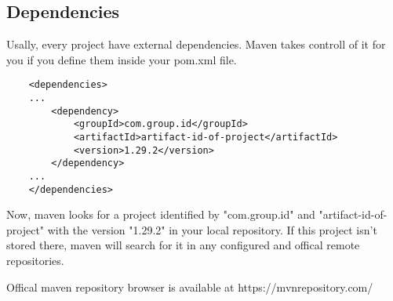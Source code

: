 \subsection{Dependencies}
Usally, every project have external dependencies. Maven takes controll of it for you if you define them inside your pom.xml file.
\begin{lstlisting}
	<dependencies>
	...
		<dependency>
			<groupId>com.group.id</groupId>
			<artifactId>artifact-id-of-project</artifactId>
			<version>1.29.2</version>
		</dependency>
	...
	</dependencies>
\end{lstlisting}
Now, maven looks for a project identified by "com.group.id" and "artifact-id-of-project" with the version "1.29.2" in your local repository. If this project isn't stored there, maven will search for it in any configured and offical remote repositories. 

Offical maven repository browser is available at https://mvnrepository.com/